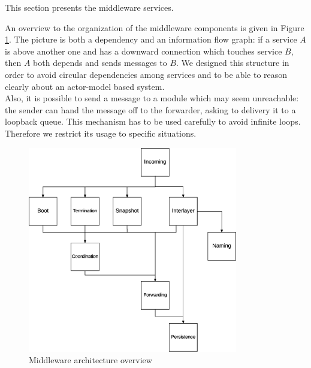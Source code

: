 This section presents the middleware services.

An overview to the organization of the middleware components is given in Figure
\ref{fig:mw-arch-over}. The picture is both a dependency and an information flow
graph: if a service $A$ is above another one and has a downward connection
which touches service $B$, then $A$ both depends and sends messages to $B$.
We designed this structure in order to avoid circular dependencies among
services and to be able to reason clearly about an actor-model based system.
\\

Also, it is possible to send a message to a module which may seem
unreachable: the sender can hand the message off to the
forwarder, asking to delivery it to a loopback queue.
This mechanism has to be used carefully to avoid infinite loops. Therefore
we restrict its usage to specific situations.

\begin{figure}[H]
  \centering
  \includegraphics[height=9cm]{images/solution/mw/overview.eps}
  \caption{Middleware architecture overview}
  \label{fig:mw-arch-over}
\end{figure}


